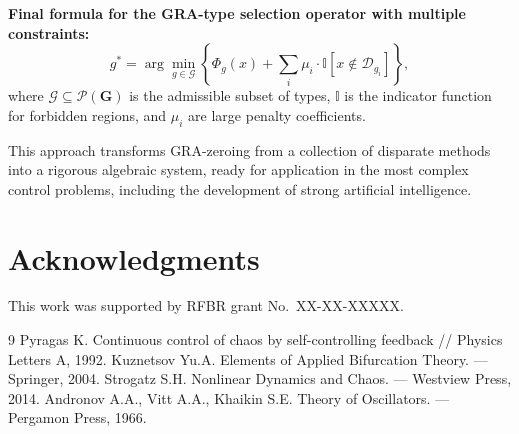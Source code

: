 \documentclass[12pt,a4paper]{article}
\newcommand{\G}{\mathbf{G}}
\newcommand{\Pset}{\mathcal{P}}
\begin{document}
\textbf{Final formula for the GRA-type selection operator with multiple constraints:}
\begin{equation}
    g^* = \arg\min_{g \in \mathcal{G}} \left\{ \Phi_g(x) + \sum_{i} \mu_i \cdot \mathbb{I}[x \notin \mathcal{D}_{g_i}] \right\},
\end{equation}
where $\mathcal{G} \subseteq \Pset(\G)$ is the admissible subset of types, $\mathbb{I}$ is the indicator function for forbidden regions, and $\mu_i$ are large penalty coefficients.

This approach transforms GRA-zeroing from a collection of disparate methods into a rigorous algebraic system, ready for application in the most complex control problems, including the development of strong artificial intelligence.

\section*{Acknowledgments}
This work was supported by RFBR grant No.~XX-XX-XXXXX.

\begin{thebibliography}{9}
 Pyragas K. Continuous control of chaos by self-controlling feedback // Physics Letters A, 1992.
 Kuznetsov Yu.A. Elements of Applied Bifurcation Theory. — Springer, 2004.
 Strogatz S.H. Nonlinear Dynamics and Chaos. — Westview Press, 2014.
 Andronov A.A., Vitt A.A., Khaikin S.E. Theory of Oscillators. — Pergamon Press, 1966.
\end{thebibliography}
\end{document}

